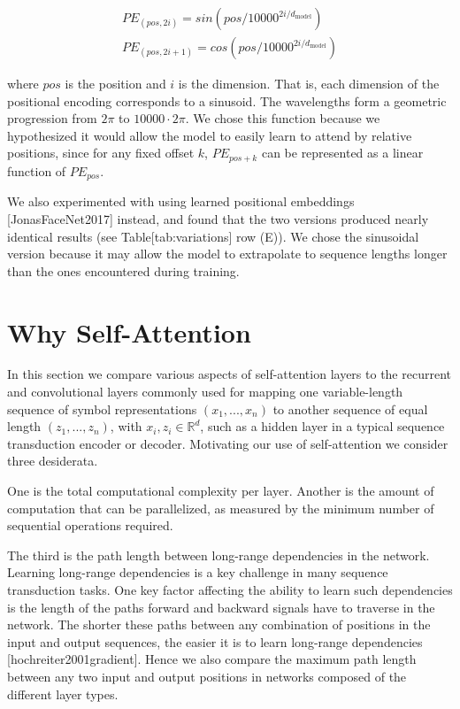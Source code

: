 \documentclass[11pt,a4paper]{article}
\begin{document}
$$\begin{align*}
    PE_{(pos,2i)} = sin(pos / 10000^{2i/d_{\text{model}}}) \\
    PE_{(pos,2i+1)} = cos(pos / 10000^{2i/d_{\text{model}}})
\end{align*}$$

where $pos$ is the position and $i$ is the dimension.  That is, each dimension of the positional encoding corresponds to a sinusoid.  The wavelengths form a geometric progression from $2\pi$ to $10000 \cdot 2\pi$.  We chose this function because we hypothesized it would allow the model to easily learn to attend by relative positions, since for any fixed offset $k$, $PE_{pos+k}$ can be represented as a linear function of $PE_{pos}$.

We also experimented with using learned positional embeddings [JonasFaceNet2017] instead, and found that the two versions produced nearly identical results (see Table[tab:variations] row (E)).  We chose the sinusoidal version because it may allow the model to extrapolate to sequence lengths longer than the ones encountered during training.

\section{Why Self-Attention}

In this section we compare various aspects of self-attention layers to the recurrent and convolutional layers commonly used for mapping one variable-length sequence of symbol representations $(x_1, ..., x_n)$ to another sequence of equal length $(z_1, ..., z_n)$, with $x_i, z_i \in \mathbb{R}^d$, such as a hidden layer in a typical sequence transduction encoder or decoder. Motivating our use of self-attention we consider three desiderata.

One is the total computational complexity per layer. Another is the amount of computation that can be parallelized, as measured by the minimum number of sequential operations required.

The third is the path length between long-range dependencies in the network. Learning long-range dependencies is a key challenge in many sequence transduction tasks. One key factor affecting the ability to learn such dependencies is the length of the paths forward and backward signals have to traverse in the network. The shorter these paths between any combination of positions in the input and output sequences, the easier it is to learn long-range dependencies [hochreiter2001gradient]. Hence we also compare the maximum path length between any two input and output positions in networks composed of the different layer types.
\end{document}

